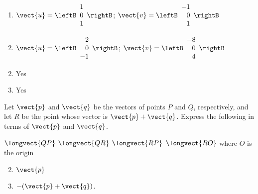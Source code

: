 \begin{multicols}{2}
\begin{ex}
\begin{enumerate}[label={\alph*.}]
\item 
$\vect{u} = \leftB
\begin{array}{r}
1\\
0\\
1
\end{array}
\rightB$;
$\vect{v} = \leftB
\begin{array}{r}
-1\\
0 \\
1
\end{array}
\rightB$


\item 
$\vect{u} = \leftB
\begin{array}{r}
2\\
0\\
-1
\end{array}
\rightB$;
$\vect{v} = \leftB
\begin{array}{r}
-8\\
0 \\
4
\end{array}
\rightB$

\end{enumerate}
\begin{sol}
\begin{enumerate}[label={\alph*.}]
\setcounter{enumi}{1}
\item  Yes

\setcounter{enumi}{3}
\item  Yes

\end{enumerate}
\end{sol}
\end{ex}


\begin{ex}
Let $\vect{p}$ and $\vect{q}$ be the vectors of points $P$ and $Q$, respectively, and let $R$ be the point whose vector is $\vect{p} + \vect{q}$. Express the following in terms of $\vect{p}$ and $\vect{q}$.

\begin{exenumerate}[column-sep=-50pt] 
\exitem $\longvect{QP}$
\exitem $\longvect{QR}$
\exitem $\longvect{RP}$
\exitem $\longvect{RO}$ where $O$ is the origin
\end{exenumerate}
\begin{sol}
\begin{enumerate}[label={\alph*.}]
\setcounter{enumi}{1}
\item $\vect{p}$

\setcounter{enumi}{3}
\item $-(\vect{p} + \vect{q})$.
\end{enumerate}
\end{sol}
\end{ex}


\end{multicols}
